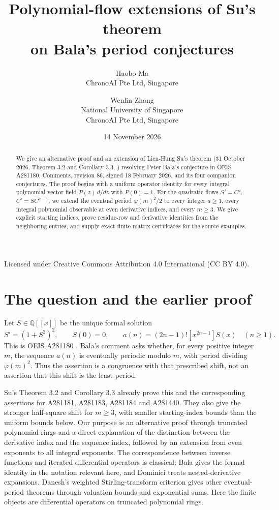 \documentclass[11pt]{article}
\title{Polynomial-flow extensions of Su's theorem\\on Bala's period conjectures}
\author{Haobo Ma\\\small ChronoAI Pte Ltd, Singapore
  \and Wenlin Zhang\\\small National University of Singapore\\\small ChronoAI Pte Ltd, Singapore}
\date{14 November 2026}
\newcommand{\Q}{\mathbb Q}
\newcommand{\ph}{\varphi}
\begin{document}
\maketitle
\begin{center}\small Licensed under Creative Commons Attribution 4.0 International
  (CC BY 4.0).\end{center}
\begin{abstract}
We give an alternative proof and an extension of Lien-Hung Su's theorem
(31 October 2026, Theorem 3.2 and Corollary 3.3, \cite{su}) resolving
Peter Bala's conjecture in OEIS A281180, Comments, revision 86,
signed 18 February 2026, and its four companion conjectures.
The proof begins with a uniform
operator identity for every integral polynomial vector field
$P(z)\,d/dz$ with $P(0)=1$.
For the quadratic flows $S'=C^a$, $C'=SC^{a-1}$, we extend the eventual
period $\ph(m)^2/2$ to every integer $a\ge1$, every integral polynomial
observable at even derivative indices, and every $m\ge3$.
We give explicit starting indices, prove residue-row and derivative
identities from the neighboring entries, and supply exact finite-matrix
certificates for the source examples.
\end{abstract}

\section{The question and the earlier proof}
Let $S\in\Q[[x]]$ be the unique formal solution
\begin{equation}\label{eq:source}
 S'=(1+S^2)^2,\qquad S(0)=0,\qquad
 a(n)=(2n-1)![x^{2n-1}]S(x)\quad(n\ge1).
\end{equation}
This is OEIS A281180 \cite{oeis180}. Bala's comment asks whether,
for every positive integer $m$, the sequence $a(n)$ is eventually
periodic modulo $m$, with period dividing $\ph(m)^2$.
Thus the assertion is a congruence with that prescribed shift, not
an assertion that this shift is the least period.

Su's Theorem 3.2 and Corollary 3.3 \cite{su} already prove this and
the corresponding assertions for A281181, A281183, A281184 and
A281440. They also give the stronger half-square shift for $m\ge3$,
with smaller starting-index bounds than the uniform bounds below.
Our purpose is an alternative proof through truncated polynomial
rings and a direct explanation of the distinction between the
derivative index and the sequence index, followed by an extension
from even exponents to all integral exponents. The correspondence between
inverse functions and iterated differential operators is classical;
Bala \cite{bala} gives the formal identity in the notation relevant
here, and Dominici \cite{dominici} treats nested-derivative expansions.
Danesh's weighted Stirling-transform criterion \cite[Theorems 3.1
and 4.1]{danesh} gives other eventual-period theorems through valuation
bounds and exponential sums. Here the finite objects are differential
operators on truncated polynomial rings.
\end{document}
